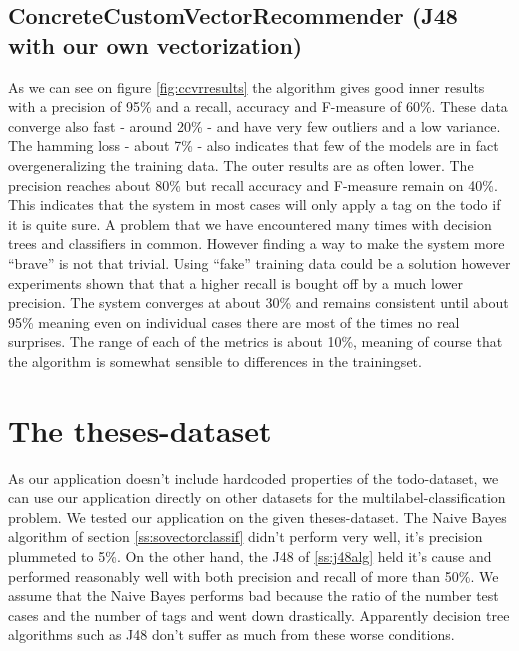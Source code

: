 \documentclass[a4paper,titlepage]{article}
\begin{document}
\subsection{ConcreteCustomVectorRecommender (J48 with our own vectorization)}
As we can see on figure \ref{fig:ccvrresults} the algorithm gives good inner results with a precision of 95\% and a recall, accuracy and F-measure of 60\%. These data converge also fast - around 20\% - and have very few outliers and a low variance. The hamming loss - about 7\% - also indicates that few of the models are in fact overgeneralizing the training data. The outer results are as often lower. The precision reaches about 80\% but recall accuracy and F-measure remain on 40\%. This indicates that the system in most cases will only apply a tag on the todo if it is quite sure. A problem that we have encountered many times with decision trees and classifiers in common. However finding a way to make the system more ``brave'' is not that trivial. Using ``fake'' training data could be a solution however experiments shown that that a higher recall is bought off by a much lower precision. The system converges at about 30\% and remains consistent until about 95\% meaning even on individual cases there are most of the times no real surprises. The range of each of the metrics is about 10\%, meaning of course that the algorithm is somewhat sensible to differences in the trainingset.
\section{The theses-dataset}
As our application doesn't include hardcoded properties of the todo-dataset, we can use our application directly on other datasets for the multilabel-classification problem. We tested our application on the given theses-dataset. The Naive Bayes algorithm of section \ref{ss:sovectorclassif} didn't perform very well, it's precision plummeted to 5\%. On the other hand, the J48 of \ref{ss:j48alg} held it's cause and performed reasonably well with both precision and recall of more than 50\%. 
We assume that the Naive Bayes performs bad because the ratio of  the number test cases  and the number of tags and went down drastically. Apparently decision tree algorithms such as J48 don't suffer as much from these worse conditions. 
\end{document}
